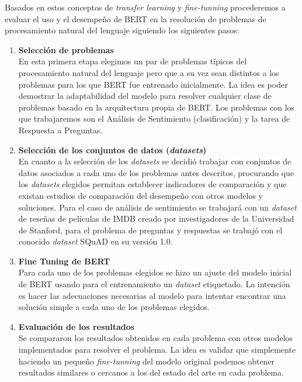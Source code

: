 Basados en estos conceptos de \textit{transfer learning} y \textit{fine-tunning} procederemos a evaluar el uso y el desempeño de BERT en la resolución de problemas de procesamiento natural del lenguaje siguiendo los siguientes pasos:

\begin{enumerate}
  \item \textbf{Selección de problemas} \\
  En esta primera etapa elegimos un par de problemas típicos del procesamiento natural del lenguaje pero que a su vez sean distintos a los problemas para los que BERT fue entrenado inicialmente. La idea es poder demostrar la adaptabilidad del modelo para resolver cualquier clase de problemas basado en la arquitectura propia de BERT. Los problemas con los que trabajaremos son el Análisis de Sentimiento (clasificación) y la tarea de Respuesta a Preguntas.
  \item \textbf{Selección de los conjuntos de datos (\textit{datasets})} \\
  En cuanto a la selección de los \textit{datasets} se decidió trabajar con conjuntos de datos asociados a cada uno de los problemas antes descritos, procurando que los \textit{datasets} elegidos permitan establecer indicadores de comparación y que existan estudios de comparación del desempeño con otros modelos y soluciones. Para el caso de análisis de sentimiento se trabajará con un \textit{dataset} de reseñas de películas de IMDB creado por investigadores de la Universidad de Stanford, para el problema de preguntas y respuestas se trabajó con el conocido \textit{dataset} SQuAD en su versión 1.0.
  \item \textbf{Fine Tuning de BERT} \\
  Para cada uno de los problemas elegidos se hizo un ajuste del modelo inicial de BERT usando para el entrenamiento un \textit{dataset} etiquetado. La intención es hacer las adecuaciones necesarias al modelo para intentar encontrar una solución simple a cada uno de los problemas elegidos.
  \item \textbf{Evaluación de los resultados} \\
  Se compararon los resultados obtenidos en cada problema con otros modelos implementados para resolver el problema. La idea es validar que simplemente haciendo un pequeño \textit{fine-tunning} del modelo original podemos obtener resultados similares o cercanos a los del estado del arte en cada problema.
\end{enumerate}

\clearpage 


\clearpage 


